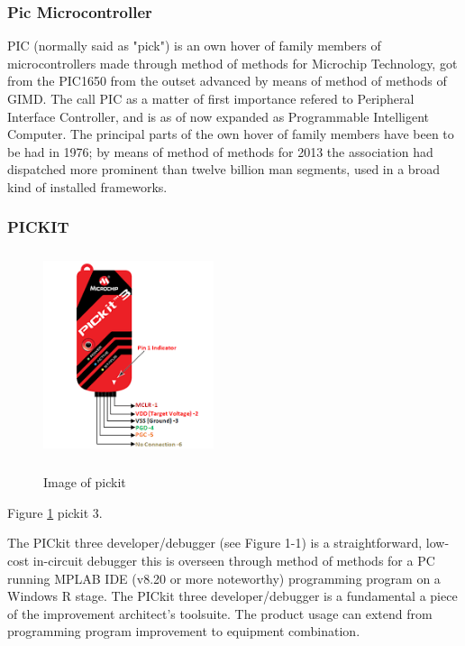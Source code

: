 \documentclass[12pt,a4paper]{article}
\begin{document}
\subsubsection{Pic Microcontroller}
\hspace{0.5cm} PIC (normally said as "pick") is an own hover of family members of microcontrollers made through method of methods for Microchip Technology, got from the PIC1650 from the outset advanced by means of method of methods of GIMD. The call PIC as a matter of first importance refered to Peripheral Interface Controller, and is as of now 
expanded as Programmable Intelligent Computer. The principal parts of the own hover of family members have been to be had 
in 1976; by means of method of methods for 2013 the association had dispatched more prominent than twelve billion man segments, used in a 
broad kind of installed frameworks.\\

\subsubsection{ PICKIT }

\begin{figure}[H]
	\centering
	\includegraphics[width=5cm, height=6cm]{pickit.png}\\
	\caption{ Image of pickit }
	\label{fig:4.3.6}
\end{figure}
\begin{center}
Figure \ref{fig:4.3.6} pickit 3.
\end{center}

\hspace{0.5cm} The PICkit three developer/debugger (see Figure 1-1) is a straightforward, low-cost in-circuit debugger this is overseen through method of methods for a PC running MPLAB IDE (v8.20 or more noteworthy) programming program on a Windows R stage. The PICkit three developer/debugger is a fundamental a piece of the improvement architect's toolsuite. The product usage can extend from programming program improvement to equipment combination.\\ 
\end{document}
